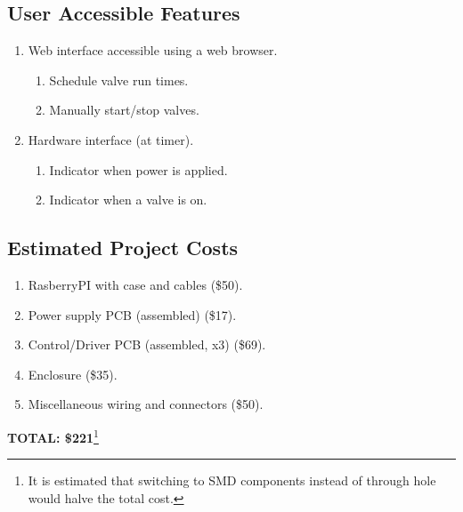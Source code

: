 \documentclass[12pt,letterpaper]{article}
\begin{document}
\begin{samepage}
\section{User Accessible Features}

\begin{enumerate}
\item Web interface accessible using a web browser.
	\begin{enumerate}
	\item Schedule valve run times.
	\item Manually start/stop valves.
	\end{enumerate}
\item Hardware interface (at timer).
	\begin{enumerate}
	\item Indicator when power is applied.
	\item Indicator when a valve is on.
	\end{enumerate}
\end{enumerate}
\end{samepage}


\begin{samepage}
\section{Estimated Project Costs}

\begin{enumerate}
\item RasberryPI\autocite{rpi} with case and cables (\$50).
\item Power supply PCB (assembled) (\$17).
\item Control/Driver PCB (assembled, x3) (\$69).
\item Enclosure (\$35).
\item Miscellaneous wiring and connectors (\$50).
\end{enumerate}

\textbf{TOTAL: \$221}\footnote{It is estimated that switching
to SMD components instead of through hole would halve the total cost.}
\end{samepage}

\pagebreak
\printbibliography[heading=bibintoc]
\end{document}
